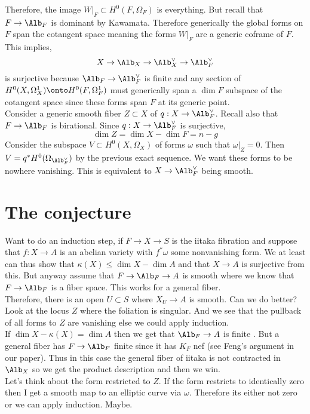 \documentclass[12pt]{article}
\begin{document}
\begin{rmk}
Therefore, the image $W|_F \subset H^0(F, \Omega_F)$ is everything. But recall that $F \to \Alb_F$ is dominant by Kawamata. Therefore generically the global forms on $F$ span the cotangent space meaning the forms $W|_F$ are a generic coframe of $F$. This implies,
\[ X \to \Alb_X \to \Alb_X^\vee \to \Alb_F^\vee \]
is surjective because $\Alb_F \to \Alb_F^\vee$ is finite and any section of $H^0(X, \Omega_X^1) \onto H^0(F, \Omega^1_F)$ must generically span a $\dim{F}$ subspace of the cotangent space since these forms span $F$ at its generic point.
\bigskip\\
Consider a generic smooth fiber $Z \subset X$ of $q : X \to \Alb_F^\vee$. Recall also that $F \to \Alb_F$ is birational. Since $q : X \to \Alb_F^\vee$ is surjective,
\[ \dim{Z} = \dim{X} - \dim{F} = n - g \]
Consider the subspace $V \subset H^0(X, \Omega_X)$ of forms $\omega$ such that $\omega|_Z = 0$. Then $V = q^* H^0(\Omega_{\Alb_F^\vee})$ by the previous exact sequence. We want these forms to be nowhere vanishing. This is equivalent to $X \to \Alb_F^\vee$ being smooth.
\end{rmk}

\section{The conjecture}

Want to do an induction step, if $F \to X \to S$ is the iitaka fibration and suppose that $f : X \to A$ is an abelian variety with $f^* \omega$ some nonvanishing form. We at least can thus show that $\kappa(X) \le \dim{X} - \dim{A}$ and that $X \to A$ is surjective from this. But anyway assume that $F \to \Alb_F \to A$ is smooth where we know that $F \to \Alb_F$ is a fiber space. This works for a general fiber. 
\bigskip\\
Therefore, there is an open $U \subset S$ where $X_U \to A$ is smooth. Can we do better? Look at the locus $Z$ where the foliation is singular. And we see that the pullback of all forms to $Z$ are vanishing else we could apply induction.
\bigskip\\
If $\dim{X} - \kappa(X) = \dim{A}$ then we get that $\Alb_F \to A$ is finite \etale. But a general fiber has $F \to \Alb_F$ finite \etale since it has $K_F$ nef (see Feng's argument in our paper). Thus in this case the general fiber of iitaka is not contracted in $\Alb_X$ so we get the product description and then we win.
\bigskip\\
Let's think about the form restricted to $Z$.  If the form restricts to identically zero then I get a smooth map to an elliptic curve via $\omega$. Therefore its either not zero or we can apply induction. Maybe. 
\end{document}
